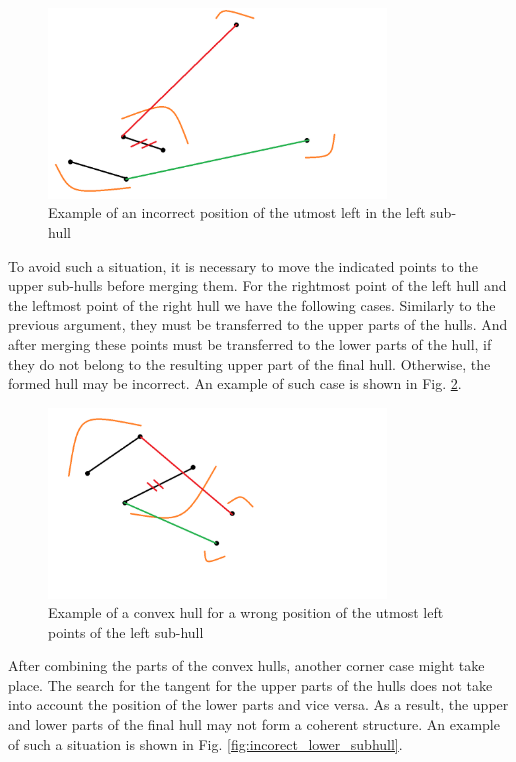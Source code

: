 \documentclass[a4paper,UKenglish,cleveref, autoref]{socg-lipics-v2019}
\begin{document}
	\begin{figure}[t]
		\centering
		\includegraphics[width=0.8\textwidth, height=0.3\textheight]{incorect_search}
		\caption{Example of an incorrect position of the utmost left in the left sub-hull}
		\label{fig:incorect_search}
	\end{figure}
	
	To avoid such a situation, it is necessary to move the indicated points to the upper sub-hulls before merging them. For the rightmost point of the left hull and the leftmost point of the right hull we have the following cases. Similarly to the previous argument, they must be transferred to the upper parts of the hulls. And after merging these points must be transferred to the lower parts of the hull, if they do not belong to the resulting upper part of the final hull. Otherwise, the formed hull may be incorrect. An example of such case is shown in Fig. \ref{fig:incorect_edge_points}.
	
	
	\begin{figure}[t]
		\centering
		\includegraphics[width=0.8\textwidth, height=0.3\textheight]{incorect_edge_points}
		\caption{Example of a convex hull for a wrong position of the utmost left points of the left sub-hull}
		\label{fig:incorect_edge_points}
	\end{figure}
	
	After combining the parts of the convex hulls, another corner case might take place. The search for the tangent for the upper parts of the hulls does not take into account the position of the lower parts and vice versa. As a result, the upper and lower parts of the final hull may not form a coherent structure. An example of such a situation is shown in Fig. \ref{fig:incorect_lower_subhull}.
	
\end{document}
